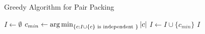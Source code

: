 \begin{frame}{Greedy Algorithm for Pair Packing}


\begin{algorithm}[H]
\begin{algorithmic}[1]

\STATE $I \gets \emptyset$
\STATE $c_{min} \gets \operatorname*{arg\,min}_{\{c : I \cup \{c\} \text{ is independent }\}}|c|$
\STATE $I \gets I \cup \{ c_{min} \}$
\ENDWHILE
\RETURN $I$


\end{algorithmic}
\caption{Greedy Algorithm}
\end{algorithm}


\end{frame}